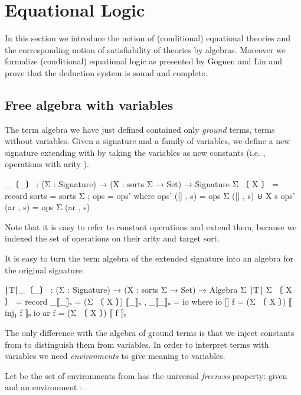 \section{Equational Logic}
\label{sec:eqlog}

In this section we introduce the notion of (conditional) equational
theories and the corresponding notion of satisfiability of theories
by algebras. Moreover we formalize (conditional) equational logic as
presented by Goguen and Lin \cite{goguen2005specifying} and prove that
the deduction system is sound and complete.

\subsection{Free algebra with variables}
The term algebra we have just defined contained only \emph{ground}
terms, \ie terms without variables. Given a signature  and \AgdaSpace{}\AgdaSymbol{:}\AgdaSpace{}\AgdaSpace{}\AgdaSpace{}\AgdaSpace{} a family of variables, we define a new signature
extending  with  by taking the variables as new constants
(i.e. , operations with arity \AgdaInductiveConstructor{[]}).
\begin{spec}
  _〔_〕 : (Σ : Signature) → (X : sorts Σ → Set) → Signature
  Σ 〔 X 〕 = record  { sorts = sorts Σ ; ops =  ops' }
     where   ops' ([] , s)   = ops Σ ([] , s) ⊎ X s
             ops' (ar , s)   = ops Σ (ar , s)
\end{spec}%
\noindent Note that it is easy to refer to constant operations and
extend them, because we indexed the set of operations on their arity
and target sort.

It is easy to turn the term algebra of the extended signature
into an algebra for the original signature:
\begin{spec}
∣T∣_〔_〕 : (Σ : Signature) → (X : sorts Σ → Set) → Algebra Σ
∣T∣ Σ 〔 X 〕  = record { _⟦_⟧ₛ =  (Σ 〔 X 〕) ⟦_⟧ₛ , _⟦_⟧ₒ = io }
  where  io {[]}  f  =  (Σ 〔 X 〕) ⟦ inj₁ f ⟧ₒ
         io {ar}  f  =  (Σ 〔 X 〕) ⟦ f ⟧ₒ
\end{spec}
\noindent The only difference with the algebra of ground terms is that
we inject constants from  to distinguish them from variables. In
order to interpret terms with variables we need \emph{environments} to
give meaning to variables.

Let  be the set of
environments from  has the
universal \emph{freeness} property: given  and an
environment  :
.

